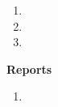 \documentclass[margin,10pt]{res} %
\begin{document}
\begin{resume}
{\begin{enumerate}[1.]
\item {}
\item {}
\item {}
\end{enumerate}
\noindent\textbf{Reports}\\
\begin{enumerate}[1.]
\item {}
\end{enumerate}
}
\end{resume}
\end{document}
